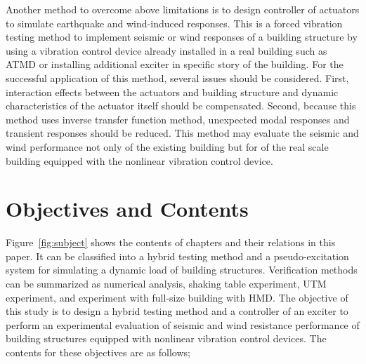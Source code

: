 Another method to overcome above limitations is to design controller of actuators to simulate earthquake and wind-induced responses. This is a forced vibration testing method to implement seismic or wind responses of a building structure by using a vibration control device already installed in a real building such as ATMD or installing additional exciter in specific story of the building. For the successful application of this method, several issues should be considered. First, interaction effects between the actuators and building structure and dynamic characteristics of the actuator itself should be compensated. Second, because this method uses inverse transfer function method, unexpected modal responses and transient responses should be reduced. This method may evaluate the seismic and wind performance not only of the existing building but for of the real scale building equipped with the nonlinear vibration control device.


\section{Objectives and Contents}
Figure~\ref{fig:subject} shows the contents of chapters and their relations in this paper. It can be classified into a hybrid testing method and a pseudo-excitation system for simulating a dynamic load of building structures. Verification methods can be summarized as numerical analysis, shaking table experiment, UTM experiment, and experiment with full-size building with HMD. The objective of this study is to design a hybrid testing method and a controller of an exciter to perform an experimental evaluation of seismic and wind resistance performance of building structures equipped with nonlinear vibration control devices. The contents for these objectives are as follows;

